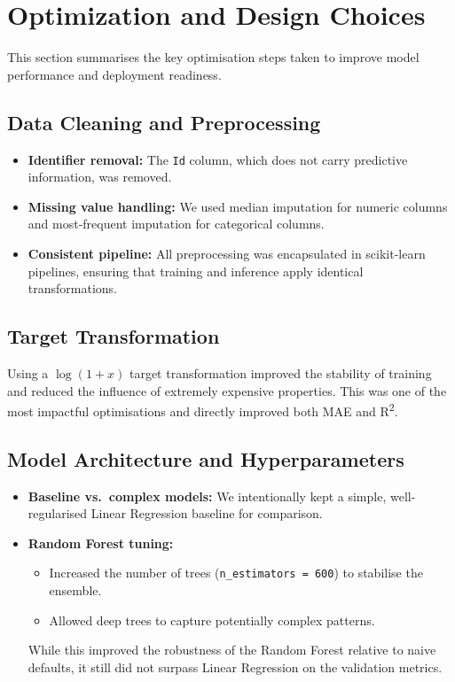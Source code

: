\documentclass[11pt,a4paper]{article}
\begin{document}
\section{Optimization and Design Choices}

This section summarises the key optimisation steps taken to improve model performance and deployment readiness.

\subsection{Data Cleaning and Preprocessing}

\begin{itemize}[leftmargin=*]
    \item \textbf{Identifier removal:} The \texttt{Id} column, which does not carry predictive information, was removed.
    \item \textbf{Missing value handling:} We used median imputation for numeric columns and most-frequent imputation for categorical columns.
    \item \textbf{Consistent pipeline:} All preprocessing was encapsulated in scikit-learn pipelines, ensuring that training and inference apply identical transformations.
\end{itemize}

\subsection{Target Transformation}

Using a \(\log(1 + x)\) target transformation improved the stability of training and reduced the influence of extremely expensive properties.
This was one of the most impactful optimisations and directly improved both MAE and R\textsuperscript{2}.

\subsection{Model Architecture and Hyperparameters}

\begin{itemize}[leftmargin=*]
    \item \textbf{Baseline vs.\ complex models:} We intentionally kept a simple, well-regularised Linear Regression baseline for comparison.
    \item \textbf{Random Forest tuning:} 
    \begin{itemize}
        \item Increased the number of trees (\texttt{n\_estimators = 600}) to stabilise the ensemble.
        \item Allowed deep trees to capture potentially complex patterns.
    \end{itemize}
    While this improved the robustness of the Random Forest relative to naive defaults, it still did not surpass Linear Regression on the validation metrics.
\end{itemize}
\end{document}
